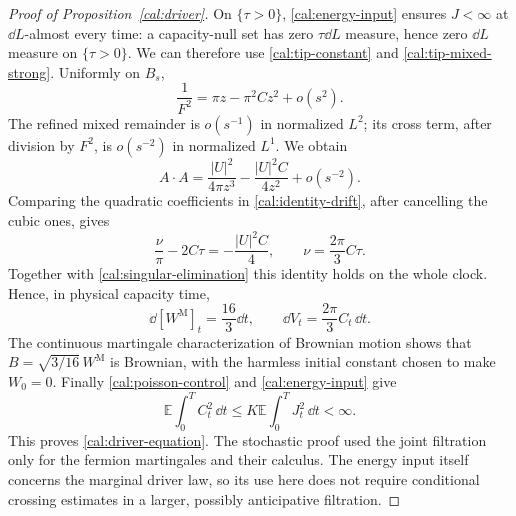 \begin{proof}[Proof of Proposition~\ref{cal:driver}]
On $\{\tau>0\}$, \eqref{cal:energy-input} ensures $J<\infty$ at
$\dd L$-almost every time: a capacity-null set has zero
$\tau\dd L$ measure, hence zero $\dd L$ measure on $\{\tau>0\}$.
We can therefore use \eqref{cal:tip-constant} and
\eqref{cal:tip-mixed-strong}.  Uniformly on $B_s$,
\[
 \frac1{F^2}=\pi z-\pi^2Cz^2+o(s^2).
\]
The refined mixed remainder is $o(s^{-1})$ in normalized $L^2$;
its cross term, after division by $F^2$, is $o(s^{-2})$ in normalized
$L^1$.  We obtain
\begin{equation}
 A\cdot A=\frac{|U|^2}{4\pi z^3}
                   -\frac{|U|^2C}{4z^2}+o(s^{-2}).
 \label{cal:second-square}
\end{equation}
Comparing the quadratic coefficients in
\eqref{cal:identity-drift}, after cancelling the cubic ones, gives
\[
 \frac\nu\pi-2C\tau=-\frac{|U|^2C}{4},
 \qquad
 \nu=\frac{2\pi}{3}C\tau.
\]
Together with \eqref{cal:singular-elimination} this identity holds on
the whole clock.  Hence, in physical capacity time,
\[
 \dd[W^{\mathrm M}]_t=\frac{16}{3}\dd t,
 \qquad
 \dd V_t=\frac{2\pi}{3}C_t\,\dd t.
\]
The continuous martingale characterization of Brownian motion shows
that $B=\sqrt{3/16}\,W^{\mathrm M}$ is Brownian, with the harmless initial
constant chosen to make $W_0=0$.  Finally
\eqref{cal:poisson-control} and \eqref{cal:energy-input} give
\[
 \mathbb E\int_0^T C_t^2\,\dd t\leq
                       K\mathbb E\int_0^T J_t^2\,\dd t<\infty.
\]
This proves \eqref{cal:driver-equation}.  The stochastic proof used the
joint filtration only for the fermion martingales and their calculus.
The energy input itself concerns the marginal driver law, so its use
here does not require conditional crossing estimates in a larger,
possibly anticipative filtration.
\end{proof}

